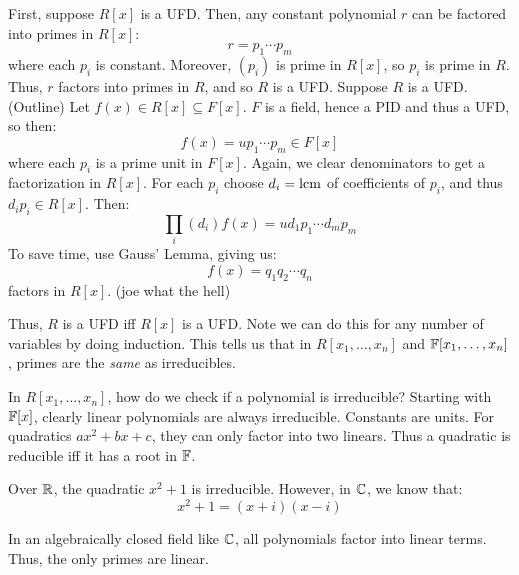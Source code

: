 \begin{pf}[source=Primary Source Material]
    First, suppose $ R[x] $ is a UFD.
    Then, any constant polynomial $ r $ can be factored into primes in $ R[x] $:
    \begin{equation*}
        r = p_{1}\cdots p_{m}
    \end{equation*}
    where each $ p_{i} $ is constant.
    Moreover, $ (p_{i}) $ is prime in $ R[x] $, so $ p_{i} $ is prime in $ R $.
    Thus, $ r $ factors into primes in $ R $, and so $ R $ is a UFD. \vsp
    Suppose $ R $ is a UFD. (Outline) Let $ f(x) \in R[x] \subseteq F[x] $.
    $ F $ is a field, hence a PID and thus a UFD, so then:
    \begin{equation*}
        f(x) = up_{1}\cdots p_{m} \in F[x]
    \end{equation*}
    where each $ p_{i} $ is a prime unit in $ F[x] $.
    Again, we clear denominators to get a factorization in $ R[x] $.
    For each $ p_{i} $ choose $ d_{i} = \operatorname{lcm} $ of coefficients of $ p_{i} $,
    and thus $ d_{i}p_{i} \in R[x] $. Then:
    \begin{equation*}
        \prod_{i}(d_{i})f(x)=ud_{1}p_{1}\cdots d_{m}p_{m}
    \end{equation*}
    To save time, use Gauss' Lemma, giving us:
    \begin{equation*}
        f(x) = q_{1}q_{2}\cdots q_{n}
    \end{equation*}
    factors in $ R[x] $. (joe what the hell)
\end{pf}
Thus, $ R $ is a UFD iff $ R[x] $ is a UFD.
Note we can do this for any number of variables by doing induction.
This tells us that in $ R[x_{1},\dots,x_{n}] $ and $ \mathbb{F}[x_{1},\dots,x_{n}] $,
primes are the \textit{same} as irreducibles.

In $ R[x_{1},\dots,x_{n}] $, how do we check if a polynomial is irreducible?
Starting with $ \mathbb{F}[x] $, clearly linear polynomials are always irreducible. Constants are units.
For quadratics $ ax^{2}+bx+c $, they can only factor into two linears.
Thus a quadratic is reducible iff it has a root in $ \mathbb{F} $.

\begin{xmp}[source=Primary Source Material]
    Over $ \mathbb{R} $, the quadratic $ x^{2}+1 $ is irreducible.
    However, in $ \mathbb{C} $, we know that:
    \begin{equation*}
        x^{2}+1 = (x+i)(x-i)
    \end{equation*}
\end{xmp}
In an algebraically closed field like $ \mathbb{C} $, all polynomials factor into linear terms.
Thus, the only primes are linear.

